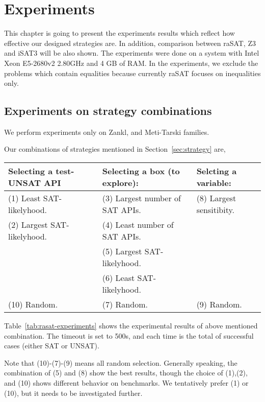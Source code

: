 \chapter{Experiments}
This chapter is going to present the experiments results which reflect how effective our designed strategies are. In addition, comparison between raSAT, Z3 and iSAT3 will be also shown. The experiments were done on a system with  Intel Xeon E5-2680v2 2.80GHz and 4 GB of RAM. In the experiments, we exclude the problems which contain equalities because currently raSAT focuses on inequalities only.

\section{Experiments on strategy combinations} \label{sec:expstrategy}

We perform experiments only on Zankl, and Meti-Tarski families. 


Our combinations of strategies mentioned in Section~\ref{sec:strategy} are, 

\medskip
{\centering
\begin{tabular}{l|l|l}
Selecting a test-UNSAT API~~ & Selecting a box (to explore): & 
Selcting a variable: \\  %
\hline

(1) Least SAT-likelyhood. & 
(3) Largest number of SAT APIs.~~ & 
(8) Largest sensitibity. \\

(2) Largest SAT-likelyhood. & 
(4) Least number of SAT APIs. & \\

& (5) Largest SAT-likelyhood. & \\

& (6) Least SAT-likelyhood. & \\

(10) Random. & (7) Random. & (9) Random. \\
\end{tabular}
}
\medskip

Table~\ref{tab:rasat-experiments} shows the experimental results of above mentioned combination. 
The timeout is set to 500s, and each time is the total of successful cases 
(either SAT or UNSAT). 

Note that (10)-(7)-(9) means all random selection. 
Generally speaking, the combination of (5) and (8) show the best results, 
though the choice of (1),(2), and (10) shows different behavior on benchmarks. 
We tentatively prefer (1) or (10), but it needs to be investigated further. 

